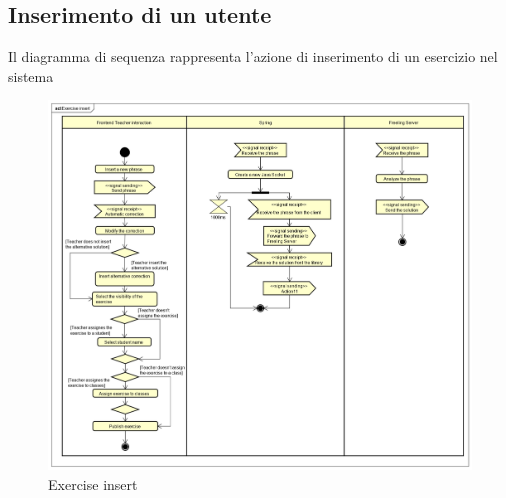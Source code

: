 \subsection{Inserimento di un utente}
Il diagramma di sequenza rappresenta l'azione di inserimento di un esercizio nel sistema
\begin{figure}[H]
\centering
\includegraphics[width=17cm, keepaspectratio]{img/Exercise-insert.png} 
\caption{Exercise insert}
\end{figure}

